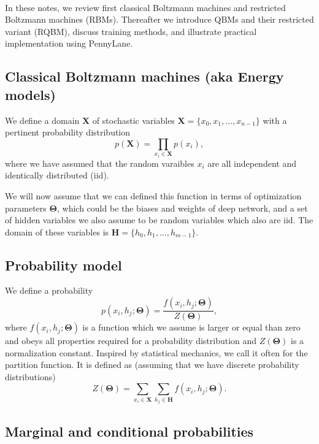 \documentclass[%
oneside,                 %
final,                   %
10pt]{article}
\begin{document}
\paragraph{}
In these notes, we review
first classical Boltzmann machines and restricted Boltzmann machines (RBMs).
Thereafter we
introduce QBMs and their restricted variant (RQBM), discuss training
methods, and illustrate practical implementation using
PennyLane.



\subsection{Classical Boltzmann machines (aka Energy models)}

We define a domain $\bm{X}$ of stochastic variables $\bm{X}= \{x_0,x_1, \dots , x_{n-1}\}$ with a pertinent probability distribution
\[
p(\bm{X})=\prod_{x_i\in \bm{X}}p(x_i),
\]
where we have assumed that the random varaibles $x_i$ are all independent and identically distributed (iid).

We will now assume that we can defined this function in terms of optimization parameters $\bm{\Theta}$, which could be the biases and weights of deep network, and a set of hidden variables we also assume to be random variables which also are iid. The domain of these variables is
$\bm{H}= \{h_0,h_1, \dots , h_{m-1}\}$.

\subsection{Probability model}

We define a probability
\[
p(x_i,h_j;\bm{\Theta}) = \frac{f(x_i,h_j;\bm{\Theta})}{Z(\bm{\Theta})},
\]
where $f(x_i,h_j;\bm{\Theta})$ is a function which we assume is larger or
equal than zero and obeys all properties required for a probability
distribution and $Z(\bm{\Theta})$ is a normalization constant. Inspired by
statistical mechanics, we call it often for the partition function.
It is defined as (assuming that we have discrete probability distributions)
\[
Z(\bm{\Theta})=\sum_{x_i\in \bm{X}}\sum_{h_j\in \bm{H}} f(x_i,h_j;\bm{\Theta}).
\]

\subsection{Marginal and conditional probabilities}
\end{document}
